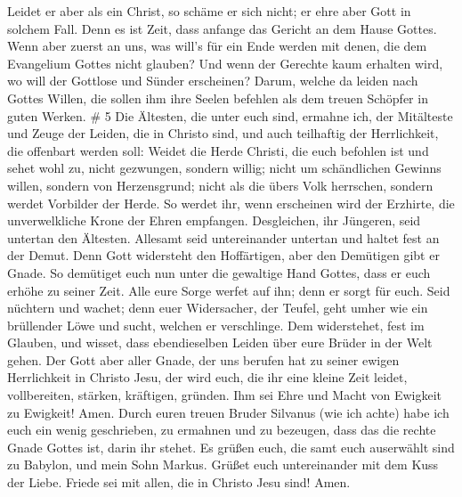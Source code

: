  Leidet er aber als ein Christ, so schäme er sich nicht; er
ehre aber Gott in solchem Fall.  Denn es ist Zeit, dass
anfange das Gericht an dem Hause Gottes. Wenn aber zuerst an uns, was
will's für ein Ende werden mit denen, die dem Evangelium Gottes nicht
glauben?  Und wenn der Gerechte kaum erhalten wird, wo will
der Gottlose und Sünder erscheinen?  Darum, welche da
leiden nach Gottes Willen, die sollen ihm ihre Seelen befehlen als dem
treuen Schöpfer in guten Werken. \# 5  Die Ältesten, die
unter euch sind, ermahne ich, der Mitälteste und Zeuge der Leiden, die
in Christo sind, und auch teilhaftig der Herrlichkeit, die offenbart
werden soll:  Weidet die Herde Christi, die euch befohlen
ist und sehet wohl zu, nicht gezwungen, sondern willig; nicht um
schändlichen Gewinns willen, sondern von Herzensgrund; 
nicht als die übers Volk herrschen, sondern werdet Vorbilder der Herde.
 So werdet ihr, wenn erscheinen wird der Erzhirte, die
unverwelkliche Krone der Ehren empfangen.  Desgleichen, ihr
Jüngeren, seid untertan den Ältesten. Allesamt seid untereinander
untertan und haltet fest an der Demut. Denn Gott widersteht den
Hoffärtigen, aber den Demütigen gibt er Gnade.  So demütiget
euch nun unter die gewaltige Hand Gottes, dass er euch erhöhe zu seiner
Zeit.  Alle eure Sorge werfet auf ihn; denn er sorgt für
euch.  Seid nüchtern und wachet; denn euer Widersacher, der
Teufel, geht umher wie ein brüllender Löwe und sucht, welchen er
verschlinge.  Dem widerstehet, fest im Glauben, und wisset,
dass ebendieselben Leiden über eure Brüder in der Welt gehen.
 Der Gott aber aller Gnade, der uns berufen hat zu seiner
ewigen Herrlichkeit in Christo Jesu, der wird euch, die ihr eine kleine
Zeit leidet, vollbereiten, stärken, kräftigen, gründen. 
Ihm sei Ehre und Macht von Ewigkeit zu Ewigkeit! Amen. 
Durch euren treuen Bruder Silvanus (wie ich achte) habe ich euch ein
wenig geschrieben, zu ermahnen und zu bezeugen, dass das die rechte
Gnade Gottes ist, darin ihr stehet.  Es grüßen euch, die
samt euch auserwählt sind zu Babylon, und mein Sohn Markus.
 Grüßet euch untereinander mit dem Kuss der Liebe. Friede
sei mit allen, die in Christo Jesu sind! Amen.
